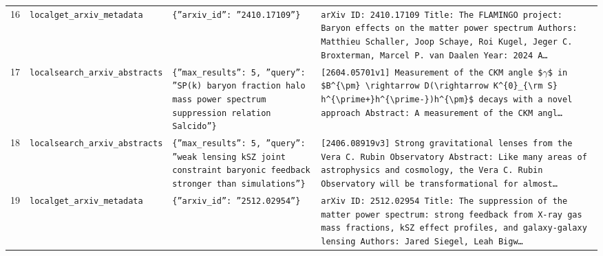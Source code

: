\documentclass[11pt,a4paper]{article}
\begin{document}
\begin{longtable}{@{}p{}p{}p{}p{}@{}}
16 & \texttt{local}\newline\texttt{get\_\allowbreak{}arxiv\_\allowbreak{}metadata} & \texttt{\{''arxiv\_\allowbreak{}id'':\allowbreak{} ''2410.17109''\}\allowbreak{}} & \texttt{arXiv ID:\allowbreak{} 2410.17109 Title:\allowbreak{} The FLAMINGO project:\allowbreak{} Baryon effects on the matter power spectrum Authors:\allowbreak{} Matthieu Schaller,\allowbreak{} Joop Schaye,\allowbreak{} Roi Kugel,\allowbreak{} Jeger C. Broxterman,\allowbreak{} Marcel P. van Daalen Year:\allowbreak{} 2024 A\ldots{}\allowbreak{}} \\
17 & \texttt{local}\newline\texttt{search\_\allowbreak{}arxiv\_\allowbreak{}abstracts} & \texttt{\{''max\_\allowbreak{}results'':\allowbreak{} 5,\allowbreak{} ''query'':\allowbreak{} ''SP(k)\allowbreak{} baryon fraction halo mass power spectrum suppression relation Salcido''\}\allowbreak{}} & \texttt{[2604.05701v1]\allowbreak{} Measurement of the CKM angle \$$\gamma$\$ in \$B\textasciicircum{}\allowbreak{}\{\textbackslash{}\allowbreak{}pm\}\allowbreak{} \textbackslash{}\allowbreak{}rightarrow D(\textbackslash{}\allowbreak{}rightarrow K\textasciicircum{}\allowbreak{}\{0\}\allowbreak{}\_\allowbreak{}\{\textbackslash{}\allowbreak{}rm S\}\allowbreak{} h\textasciicircum{}\allowbreak{}\{\textbackslash{}\allowbreak{}prime+\}\allowbreak{}h\textasciicircum{}\allowbreak{}\{\textbackslash{}\allowbreak{}prime-\}\allowbreak{})\allowbreak{}h\textasciicircum{}\allowbreak{}\{\textbackslash{}\allowbreak{}pm\}\allowbreak{}\$ decays with a novel approach Abstract:\allowbreak{} A measurement of the CKM angl\ldots{}\allowbreak{}} \\
18 & \texttt{local}\newline\texttt{search\_\allowbreak{}arxiv\_\allowbreak{}abstracts} & \texttt{\{''max\_\allowbreak{}results'':\allowbreak{} 5,\allowbreak{} ''query'':\allowbreak{} ''weak lensing kSZ joint constraint baryonic feedback stronger than simulations''\}\allowbreak{}} & \texttt{[2406.08919v3]\allowbreak{} Strong gravitational lenses from the Vera C. Rubin Observatory Abstract:\allowbreak{} Like many areas of astrophysics and cosmology,\allowbreak{} the Vera C. Rubin Observatory will be transformational for almost\ldots{}\allowbreak{}} \\
19 & \texttt{local}\newline\texttt{get\_\allowbreak{}arxiv\_\allowbreak{}metadata} & \texttt{\{''arxiv\_\allowbreak{}id'':\allowbreak{} ''2512.02954''\}\allowbreak{}} & \texttt{arXiv ID:\allowbreak{} 2512.02954 Title:\allowbreak{} The suppression of the matter power spectrum:\allowbreak{} strong feedback from X-ray gas mass fractions,\allowbreak{} kSZ effect profiles,\allowbreak{} and galaxy-galaxy lensing Authors:\allowbreak{} Jared Siegel,\allowbreak{} Leah Bigw\ldots{}\allowbreak{}} \\

\end{longtable}
\end{document}
